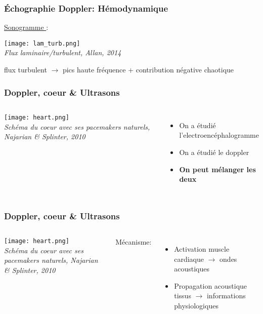 \documentclass{beamer}
\begin{document}
\begin{frame}
\frametitle{\'Echographie Doppler: Hémodynamique}
\underline{Sonogramme }: 
\begin{center}
\texttt{[image: lam\_turb.png]}\\
\textit{\footnotesize Flux laminaire/turbulent, Allan, 2014}
\end{center}
\vspace{0.3cm}
flux turbulent $\rightarrow$ pics haute fréquence + contribution négative chaotique

\end{frame}

\begin{frame}
\frametitle{Doppler, coeur \& Ultrasons}
\begin{columns}
\column{60mm}
\begin{center}
\texttt{[image: heart.png]}\\
\textit{\footnotesize Schéma du coeur avec ses pacemakers
naturels, Najarian \& Splinter, 2010}
\end{center}
\column{60mm}
\begin{itemize}
\item On a étudié l'electroencéphalogramme
\vspace{0.5cm}
\item On a étudié le doppler 
\vspace{0.5cm}
\item \textbf{On peut mélanger les deux}
\end{itemize}
\end{columns}
\end{frame}

\begin{frame}
\frametitle{Doppler, coeur \& Ultrasons}
\begin{columns}
\column{60mm}
\begin{center}
\texttt{[image: heart.png]}\\
\textit{\footnotesize Schéma du coeur avec ses pacemakers
naturels, Najarian \& Splinter, 2010}
\end{center}
\column{60mm}
Mécanisme:
\begin{itemize}
\item Activation muscle cardiaque $\rightarrow$ ondes acoustiques
\vspace{0.5cm}
\item Propagation acoustique tissus $\rightarrow$ informations physiologiques
\vspace{0.5cm}

\end{itemize}

\end{columns}
\end{frame}
\end{document}
